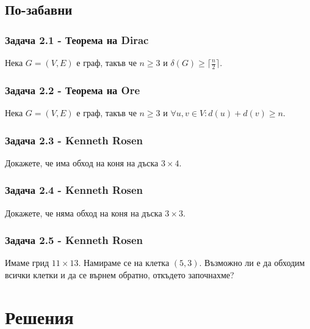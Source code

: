 \documentclass[12pt]{article}
\begin{document}
\subsection*{По-забавни}
\subsubsection*{Задача 2.1 - Теорема на Dirac}
Нека $G = (V, E)$ е граф, такъв че $n \geq 3$ и $\delta(G) \geq \lceil \frac{n}{2} \rceil$.
\subsubsection*{Задача 2.2 - Теорема на Ore}
Нека $G = (V, E)$ е граф, такъв че $n \geq 3$ и $\forall u, v \in V: d(u) + d(v) \geq n$.
\subsubsection*{Задача 2.3 - Kenneth Rosen}
Докажете, че има обход на коня на дъска $3 \times 4$.
\subsubsection*{Задача 2.4 - Kenneth Rosen}
Докажете, че няма обход на коня на дъска $3 \times 3$.
\subsubsection*{Задача 2.5 - Kenneth Rosen}
Имаме грид $11 \times 13$. Намираме се на клетка $(5, 3)$. Възможно ли е да обходим всички клетки и да се върнем обратно, откъдето започнахме?

\section*{Решения}
\end{document}

